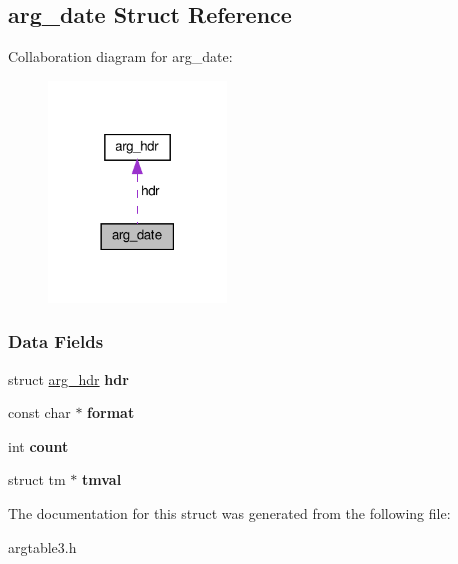 \hypertarget{structarg__date}{}\subsection{arg\+\_\+date Struct Reference}
\label{structarg__date}


Collaboration diagram for arg\+\_\+date\+:\nopagebreak
\begin{figure}[H]
\begin{center}
\leavevmode
\includegraphics[width=134pt]{structarg__date__coll__graph}
\end{center}
\end{figure}
\subsubsection*{Data Fields}
\begin{DoxyCompactItemize}
\item 
\mbox{\label{structarg__date_aaf2344a703e242481c22bdfe2a344463}} 
struct \hyperlink{structarg__hdr}{arg\+\_\+hdr} {\bfseries hdr}
\item 
\mbox{\label{structarg__date_a6d4699868e7ac513e4c46d4009376a97}} 
const char $\ast$ {\bfseries format}
\item 
\mbox{\label{structarg__date_a50d9e3b29f556f30830bf07e4cc3bda1}} 
int {\bfseries count}
\item 
\mbox{\label{structarg__date_a6d80a52ebb6691933f872fad22c281bc}} 
struct tm $\ast$ {\bfseries tmval}
\end{DoxyCompactItemize}


The documentation for this struct was generated from the following file\+:\begin{DoxyCompactItemize}
\item 
argtable3.\+h\end{DoxyCompactItemize}
